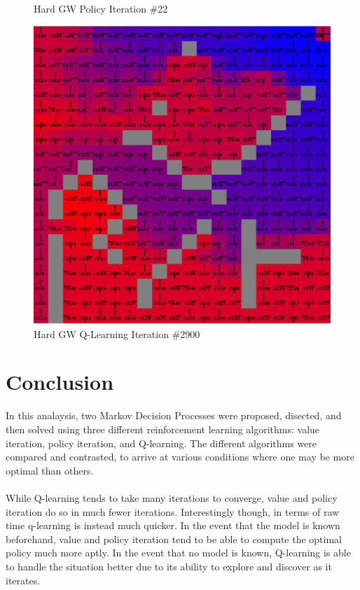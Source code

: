 \documentclass[h]{article}
\begin{document}
\begin{figure}[H]
      \caption*{Hard GW Policy Iteration \#22} 
   \endminipage\hfill
      \includegraphics[width=1\textwidth,keepaspectratio]{hard-q-2900.png} 
      \caption*{Hard GW Q-Learning Iteration \#2900} 
   \endminipage\hfill
\end{figure}

\section*{Conclusion}
In this analaysis, two Markov Decision Processes were proposed, disected, and then solved using three different reinforcement learning algorithms: 
value iteration, policy iteration, and Q-learning.  The different algorithms were compared and contrasted, to arrive at various conditions where one may be more optimal than
others.
\\ \\
While Q-learning tends to take many iterations 
to converge, value and policy iteration do so in much fewer iterations.  Interestingly though, in terms of raw time q-learning is instead much quicker.  
In the event that the model is known beforehand, value and policy iteration tend to 
be able to compute the optimal policy much more aptly.  In the event that no model 
is known, Q-learning is able to handle the situation better due to its ability to 
explore and discover as it iterates.  
\end{document}
